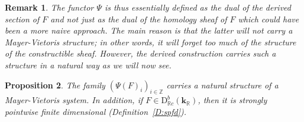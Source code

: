 \documentclass[a4paper, english, 11pt]{article}
\newcommand{\kk}[0]{\textbf{k}}
\newcommand{\0}{\vec{0}}
\newcommand{\R}[0]{\mathbb{R}}
\newcommand{\Z}[0]{\mathbb{Z}}
\newcommand{\D}[0]{\text{D}}
\newtheorem{prop}{Proposition}[section]
\newtheorem{remark}[prop]{Remark}
\begin{document}
\begin{remark}
 The functor $\Psi$ is thus essentially defined as  the dual of the derived section of $F$ and not just as the dual of the homology sheaf of $F$ which could have been a more naive approach. The main reason is that the latter will not carry a Mayer-Vietoris structure; in other words, it will forget too much of the structure of the constructible sheaf. However, the derived construction carries such a structure in a natural way as we will now see.
\end{remark}


\begin{prop}\label{P:psiofCOnstrisMV}
The family $(\Psi(F)_i)_{i\in \Z}$ carries a natural structure of a Mayer-Vietoris system. In addition, if $F\in \D^b_{\R c}(\kk_\R)$, then  it is strongly pointwise finite dimensional (Definition~\ref{D:spfd}). 
\end{prop}
\end{document}
